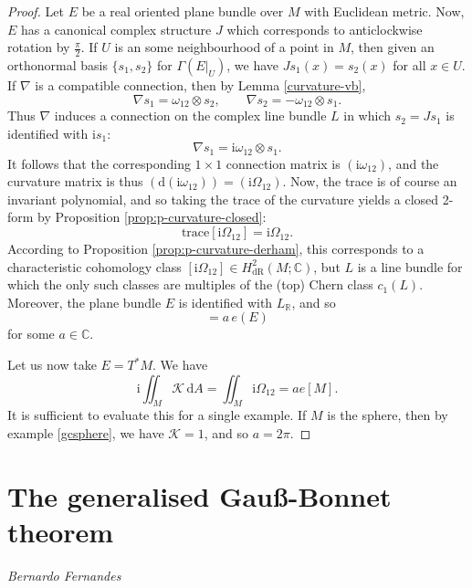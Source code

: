\documentclass[a4paper,openany]{scrbook}
\newcommand{\chapterauthor}[1]{\hfill\emph{#1}\par\noindent}
\newcommand{\ud}{\mathrm{d}}
\newcommand{\ui}{\mathrm{i}}
\begin{document}
\begin{proof}
Let $E$ be a real oriented plane bundle over $M$ with Euclidean metric. Now, $E$ has a canonical complex structure $J$ which corresponds to anticlockwise rotation by  $\frac{\pi}{2}$.  If $U$ is an some neighbourhood of a point in $M$, then given an orthonormal basis $\{s_1,s_2\}$ for $\Gamma(E|_U)$, we have $Js_1(x)=s_2(x)$ for all $x\in U$. If $\nabla$ is a compatible connection, then by Lemma \ref{curvature-vb},
\begin{equation*}
\nabla s_1=\omega_{12}\otimes s_2,\qquad\nabla s_2=-\omega_{12}\otimes s_1.
\end{equation*}
Thus $\nabla$ induces a connection on the complex line bundle $L$ in which $s_2=Js_1$ is identified with $\ui s_1$:
\begin{equation*}
\nabla s_1=\ui\omega_{12}\otimes s_1.
\end{equation*}
It follows that the corresponding $1\times1$ connection matrix is $(\ui\omega_{12})$, and the curvature matrix is thus $(\ud(\ui\omega_{12}))=(\ui\Omega_{12})$. Now, the trace is of course an invariant polynomial, and so taking the trace of the curvature yields a closed 2-form by Proposition \ref{prop:p-curvature-closed}:
\begin{equation*}
\text{trace}[\ui\Omega_{12}]=\ui\Omega_{12}.
\end{equation*}
According to Proposition \ref{prop:p-curvature-derham}, this corresponds to a characteristic cohomology class $[\ui\Omega_{12}]\in H_\text{dR}^2(M;\mathbb{C})$, but $L$ is a line bundle for which the only such classes are multiples of the (top) Chern class $c_1(L)$. Moreover, the plane bundle $E$ is identified with $L_\mathbb{R}$, and so
\begin{equation*}
[\ui\Omega_{12}]=a\,e(E)
\end{equation*}
for some $a\in\mathbb{C}$.

Let us now take $E=T^*M$. We have
\begin{equation*}
\ui\iint_M\mathcal{K}\,\ud A=\iint_M\ui\Omega_{12}=ae[M].
\end{equation*}
It is sufficient to evaluate this for a single example. If $M$ is the sphere, then by example \eqref{gcsphere}, we have $\mathcal{K}=1$, and so $a=2\pi$.
\end{proof}


\section{The generalised Gauß-Bonnet theorem}
\chapterauthor{Bernardo Fernandes}
\end{document}
